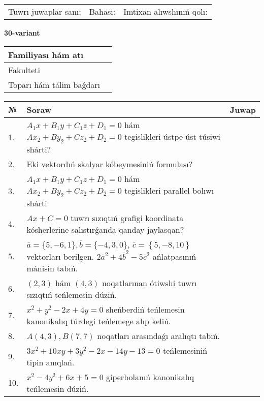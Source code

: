 \documentclass{article}
\begin{document}
\vspace{1cm}

\begin{tabular}{lll}
Tuwrı juwaplar sanı: \underline{\hspace{1.5cm}} & 
Bahası: \underline{\hspace{1.5cm}} & 
Imtixan alıwshınıń qolı: \underline{\hspace{2cm}} \\
\end{tabular}

\egroup

\newpage


\textbf{30-variant}\\

\bgroup
\def\arraystretch{1.6} %

\begin{tabular}{|m{5.7cm}|m{9.5cm}|}
\hline
Familiyası hám atı & \\
\hline
Fakulteti  & \\
\hline
Toparı hám tálim baǵdarı  & \\
\hline
\end{tabular}

\vspace{1cm}

\begin{tabular}{|m{0.7cm}|m{10cm}|m{4cm}|}
\hline
№ & Soraw & Juwap \\
\hline
1. & $A_1x+B_1y+C_1z+D_1=0$ hám $Ax_2+By_2+Cz_2+D_2=0$ tegislikleri ústpe-úst túsiwi shárti? &  \\
\hline
2. & Eki vektordıń skalyar kóbeymesiniń formulası? &  \\
\hline
3. & $A_1x+B_1y+C_1z+D_1=0$ hám $Ax_2+By_2+Cz_2+D_2=0$ tegislikleri parallel bolıwı shárti &  \\
\hline
4. & $Ax+C=0$ tuwrı sızıqtıń grafigi koordinata kósherlerine salıstırǵanda qanday jaylasqan? &  \\
\hline
5. & $\overline{a}=\{5,-6, 1 \}, \overline{b}=\{-4, 3, 0 \} $, $\overline{c}=\left\{ 5,-8, 10 \right\}$ vektorları berilgen. $2{\overline{a}}^{2}+4{\overline{b}}^{2}-5{\overline{c}}^{2}$ ańlatpasınıń mánisin tabıń. &  \\
\hline
6. & $(2, 3)$ hám $(4, 3)$ noqatlarınan ótiwshi tuwrı sızıqtıń teńlemesin dúziń. &  \\
\hline
7. & $x^{2}+y^{2}-2x+4y=0$ sheńberdiń teńlemesin kanonikalıq túrdegi teńlemege alıp keliń. &  \\
\hline
8. & $A(4, 3), B(7, 7)$ noqatları arasındaǵı aralıqtı tabıń. &  \\
\hline
9. & $3x^{2}+10xy+3y^{2}-2x-14y-13=0$ teńlemesiniń tipin anıqlań. &  \\
\hline
10. & $x^{2}-4y^{2}+6x+5=0$ giperbolanıń kanonikalıq teńlemesin dúziń. &  \\
\hline
\end{tabular}
\end{document}
